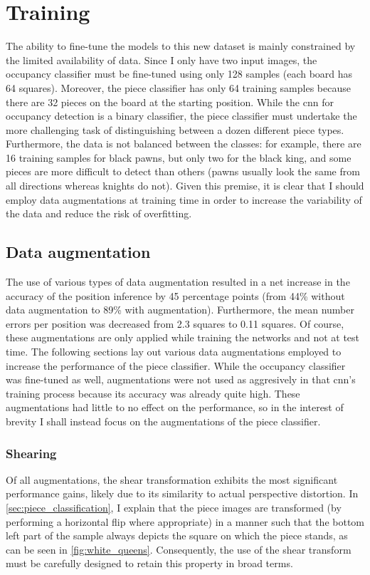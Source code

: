 \documentclass[../report.tex]{subfiles}
\begin{document}
\section{Training}
The ability to fine-tune the models to this new dataset is mainly constrained by the limited availability of data.
Since I only have two input images, the occupancy classifier must be fine-tuned using only 128 samples (each board has 64 squares).
Moreover, the piece classifier has only 64 training samples because there are 32 pieces on the board at the starting position.
While the \gls{cnn} for occupancy detection is a binary classifier, the piece classifier must undertake the more challenging task of distinguishing between a dozen different piece types.
Furthermore, the data is not balanced between the classes: for example, there are 16 training samples for black pawns, but only two for the black king, and some pieces are more difficult to detect than others (pawns usually look the same from all directions whereas knights do not).
Given this premise, it is clear that I should employ data augmentations at training time in order to increase the variability of the data and reduce the risk of overfitting.

\subsection{Data augmentation}
The use of various types of data augmentation resulted in a net increase in the accuracy of the position inference by 45 percentage points (from 44\% without data augmentation to 89\% with augmentation).
Furthermore, the mean number errors per position was decreased from 2.3 squares to 0.11 squares.
Of course, these augmentations are only applied while training the networks and not at test time.
The following sections lay out various data augmentations employed to increase the performance of the piece classifier.
While the occupancy classifier was fine-tuned as well, augmentations were not used as aggresively in that \gls{cnn}'s training process because its accuracy was already quite high.
These augmentations had little to no effect on the performance, so in the interest of brevity I shall instead focus on the augmentations of the piece classifier.

\subsubsection{Shearing}
Of all augmentations, the shear transformation exhibits the most significant performance gains, likely due to its similarity to actual perspective distortion.
In \cref{sec:piece_classification}, I explain that the piece images are transformed (by performing a horizontal flip where appropriate) in a manner such that the bottom left part of the sample always depicts the square on which the piece stands, as can be seen in \cref{fig:white_queens}.
Consequently, the use of the shear transform must be carefully designed to retain this property in broad terms.
\end{document}
